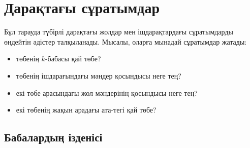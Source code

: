 \chapter{Дарақтағы сұратымдар}


Бұл тарауда түбірлі дарақтағы жолдар мен ішдарақтардағы 
сұратымдарды өңдейтін әдістер талқыланады.
Мысалы, оларға мынадай сұратымдар жатады:

\begin{itemize}
\item төбенің $k$-бабасы қай төбе?
\item төбенің ішдарағындағы мәндер қосындысы неге тең?
\item екі төбе арасындағы жол мәндерінің қосындысы неге тең?
\item екі төбенің жақын арадағы ата-тегі қай төбе?
\end{itemize}


\section{Бабалардың ізденісі}


